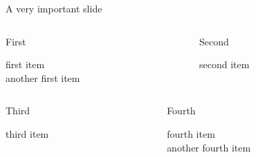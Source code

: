 \documentclass[t]{beamer}
\newcommand{\FourQuads}[4]{
    \begin{columns}[onlytextwidth]
        \begin{column}{.45\textwidth}
            \begin{block}{First}
                \begin{minipage}[t][.25\textheight][t]{\textwidth}
                    #1
                \end{minipage}
            \end{block}
        \end{column}
        \begin{column}{.45\textwidth}
            \begin{block}{Second}
                \begin{minipage}[t][.25\textheight][t]{\textwidth}
                    #2
                \end{minipage}
            \end{block}
        \end{column}        
    \end{columns}
    \begin{columns}[onlytextwidth]
        \begin{column}{.45\textwidth}
            \begin{block}{Third}
                \begin{minipage}[t][.25\textheight][t]{\textwidth}
                    #3
                \end{minipage}
            \end{block}
        \end{column}
        \begin{column}{.45\textwidth}
            \begin{block}{Fourth}
                \begin{minipage}[t][.25\textheight][t]{\textwidth}
                    #4
                \end{minipage}
            \end{block}
        \end{column}        
    \end{columns}   
}
\begin{document}
 
\begin{frame}{A very important slide}
\FourQuads%
{first item\\
another first item}
{second item}
{third item}
{fourth item\\
another fourth item}
\end{frame}
\end{document}
